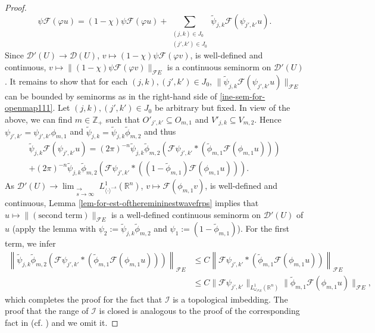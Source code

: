 \documentclass[12pt,reqno]{amsart}
\newcommand{\RR}{\mathbb R}
\newcommand{\ZZ}{\mathbb Z}
\newcommand{\DD}{\mathcal D}
\theoremstyle{plain}
\theoremstyle{remark}
\theoremstyle{definition}
\numberwithin{equation}{section}
\begin{document}
\begin{proof}
\begin{equation}\label{sum-for-bou-ftoplimbed111}
\psi\mathcal{F}(\varphi u)= (1-\chi)\psi\mathcal{F}(\varphi u)+\sum_{\substack{(j,k)\in J_0\\ (j',k')\in J_0}} \widetilde{\psi}_{j,k}\mathcal{F}(\psi_{j',k'} u).
\end{equation}
Since $\DD'(U)\rightarrow \DD(U)$, $v\mapsto (1-\chi)\psi\mathcal{F}(\varphi v)$, is well-defined and continuous, $v\mapsto \|(1-\chi)\psi\mathcal{F}(\varphi v)\|_{\mathcal{F}E}$ is a continuous seminorm on $\DD'(U)$. It remains to show that for each $(j,k),(j',k')\in J_0$, $\|\widetilde{\psi}_{j,k}\mathcal{F}(\psi_{j',k'} u)\|_{\mathcal{F}E}$ can be bounded by seminorms as in the right-hand side of \eqref{ine-sem-for-openmap111}. Let $(j,k),(j',k')\in J_0$ be arbitrary but fixed. In view of the above, we can find $m\in\ZZ_+$ such that $O'_{j',k'}\subseteq O_{m,1}$ and $V'_{j,k}\subseteq V_{m,2}$. Hence $\psi_{j',k'}=\psi_{j',k'}\phi_{m,1}$ and $\widetilde{\psi}_{j,k}=\widetilde{\psi}_{j,k}\widetilde{\phi}_{m,2}$ and thus
\begin{multline*}
\widetilde{\psi}_{j,k}\mathcal{F}(\psi_{j',k'} u) =(2\pi)^{-n}\widetilde{\psi}_{j,k}\widetilde{\phi}_{m,2}\left(\mathcal{F}\psi_{j',k'}*\left(\widetilde{\phi}_{m,1}\mathcal{F}(\phi_{m,1} u)\right)\right)\\
+(2\pi)^{-n}\widetilde{\psi}_{j,k}\widetilde{\phi}_{m,2}\left(\mathcal{F}\psi_{j',k'}*\left((1-\widetilde{\phi}_{m,1})\mathcal{F}(\phi_{m,1} u)\right)\right).
\end{multline*}
As $\DD'(U)\rightarrow \displaystyle \lim_{\substack{\longrightarrow\\ s\rightarrow\infty}}L^1_{\langle\cdot\rangle^{-s}}(\RR^n)$, $v\mapsto \mathcal{F}(\phi_{m,1} v)$, is well-defined and continuous, Lemma \ref{lem-for-est-oftheremininestwavefrps} implies that $u\mapsto \|(\mbox{second term})\|_{\mathcal{F}E}$ is a well-defined continuous seminorm on $\DD'(U)$ of $u$ (apply the lemma with $\psi_2:=\widetilde{\psi}_{j,k}\widetilde{\phi}_{m,2}$ and $\psi_1:=(1-\widetilde{\phi}_{m,1})$). For the first term, we infer
\begin{align*}
\left\|\widetilde{\psi}_{j,k}\widetilde{\phi}_{m,2}\left(\mathcal{F}\psi_{j',k'}*\left(\widetilde{\phi}_{m,1}\mathcal{F}(\phi_{m,1} u)\right)\right)\right\|_{\mathcal{F}E}&\leq C\left\|\mathcal{F}\psi_{j',k'}*\left(\widetilde{\phi}_{m,1}\mathcal{F}(\phi_{m,1} u)\right)\right\|_{\mathcal{F}E}\\
&\leq C\|\mathcal{F}\psi_{j',k'}\|_{L^1_{\omega_{\mathcal{F}E}}(\RR^n)}\|\widetilde{\phi}_{m,1}\mathcal{F}(\phi_{m,1} u)\|_{\mathcal{F}E},
\end{align*}
which completes the proof for the fact that $\mathcal{I}$ is a topological imbedding. The proof that the range of $\mathcal{I}$ is closed is analogous to the proof of the corresponding fact in \cite[Proposition 3.7]{PP} (cf. \cite[Remark 3.8]{PP}) and we omit it.
\end{proof}
\end{document}
